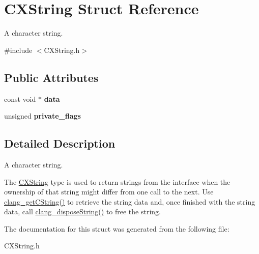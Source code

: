 \hypertarget{structCXString}{}\section{C\+X\+String Struct Reference}
\label{structCXString}


A character string.  




{\ttfamily \#include $<$C\+X\+String.\+h$>$}

\subsection*{Public Attributes}
\begin{DoxyCompactItemize}
\item 
\mbox{\label{structCXString_a22192d0215a9fc17b9859b0d59af9f00}} 
const void $\ast$ {\bfseries data}
\item 
\mbox{\label{structCXString_a079754f256fc9ae141ecb0d527e74930}} 
unsigned {\bfseries private\+\_\+flags}
\end{DoxyCompactItemize}


\subsection{Detailed Description}
A character string. 

The {\ttfamily \mbox{\hyperlink{structCXString}{C\+X\+String}}} type is used to return strings from the interface when the ownership of that string might differ from one call to the next. Use {\ttfamily \mbox{\hyperlink{group__CINDEX__STRING_gafd043aa189e990b9e327e9f95a1da8a5}{clang\+\_\+get\+C\+String()}}} to retrieve the string data and, once finished with the string data, call {\ttfamily \mbox{\hyperlink{group__CINDEX__STRING_gaeff715b329ded18188959fab3066048f}{clang\+\_\+dispose\+String()}}} to free the string. 

The documentation for this struct was generated from the following file\+:\begin{DoxyCompactItemize}
\item 
C\+X\+String.\+h\end{DoxyCompactItemize}

